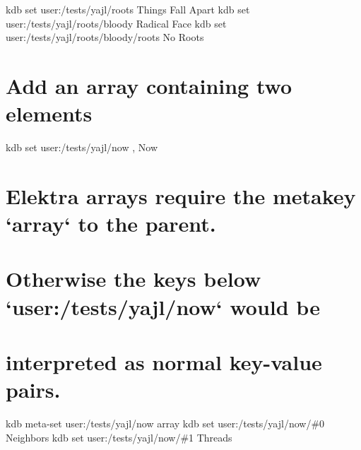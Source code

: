 kdb set user\+:/tests/yajl/roots \textquotesingle{}Things Fall Apart\textquotesingle{} kdb set user\+:/tests/yajl/roots/bloody \textquotesingle{}Radical Face\textquotesingle{} kdb set user\+:/tests/yajl/roots/bloody/roots \textquotesingle{}No Roots\textquotesingle{}\hypertarget{autotoc_md786_autotoc_md807}{}\section{Add an array containing two elements}\label{autotoc_md786_autotoc_md807}
kdb set user\+:/tests/yajl/now \textquotesingle{}, Now\textquotesingle{} \hypertarget{autotoc_md786_autotoc_md808}{}\section{Elektra arrays require the metakey `array` to the parent.}\label{autotoc_md786_autotoc_md808}
\hypertarget{autotoc_md786_autotoc_md809}{}\section{Otherwise the keys below `user\+:/tests/yajl/now` would be}\label{autotoc_md786_autotoc_md809}
\hypertarget{autotoc_md786_autotoc_md810}{}\section{interpreted as normal key-\/value pairs.}\label{autotoc_md786_autotoc_md810}
kdb meta-\/set user\+:/tests/yajl/now array \textquotesingle{}\textquotesingle{} kdb set user\+:/tests/yajl/now/\#0 \textquotesingle{}Neighbors\textquotesingle{} kdb set user\+:/tests/yajl/now/\#1 \textquotesingle{}Threads\textquotesingle{}

